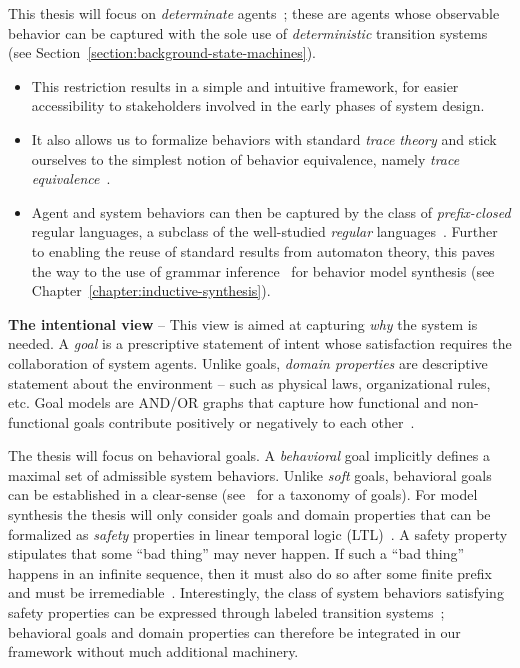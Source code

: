 This thesis will focus on \emph{determinate} agents~\cite{Engelfriet:1985}; these are agents whose observable behavior can be captured with the sole use of \emph{deterministic} transition systems (see Section~\ref{section:background-state-machines}).
\begin{itemize} 
\item This restriction results in a simple and intuitive framework, for easier accessibility to stakeholders involved in the early phases of system design. 
\item It also allows us to formalize behaviors with standard \emph{trace theory} \cite{Hoare:1985} and stick ourselves to the simplest notion of behavior equivalence, namely \emph{trace equivalence}~\cite{Engelfriet:1985}. 
\item Agent and system behaviors can then be captured by the class of \emph{prefix-closed} regular languages, a subclass of the well-studied \emph{regular} languages~\cite{Hopcroft:1979, Aho:1986}. Further to enabling the reuse of standard results from automaton theory, this paves the way to the use of grammar inference~\cite{Gold:1978} for behavior model synthesis (see Chapter~\ref{chapter:inductive-synthesis}). 
\end{itemize}


\noindent \textbf{The intentional view} -- This view is aimed at capturing \emph{why} the system is needed. A \emph{goal} is a prescriptive statement of intent whose satisfaction requires the collaboration of system agents. Unlike goals, \emph{domain properties} are descriptive statement about the environment -- such as physical laws, organizational rules, etc. Goal models are AND/OR graphs that capture how functional and non-functional goals contribute positively or negatively to each other~\cite{VanLamsweerde:2000, VanLamsweerde:2004}.

The thesis will focus on behavioral goals. A \emph{behavioral} goal implicitly defines a maximal set of admissible system behaviors. Unlike \emph{soft} goals, behavioral goals can be established in a clear-sense (see~\cite{VanLamsweerde:2009} for a taxonomy of goals). For model synthesis the thesis will only consider goals and domain properties that can be formalized as \emph{safety} properties in linear temporal logic (LTL)~\cite{Manna:1992}. A safety property stipulates that some ``bad thing'' may never happen. If such a ``bad thing'' happens in an infinite sequence, then it must also do so after some finite prefix and must be irremediable~\cite{Alpern:1986, Giannakopoulou:1999}. Interestingly, the class of system behaviors satisfying safety properties can be expressed through labeled transition systems~\cite{Giannakopoulou:2003}; behavioral goals and domain properties can therefore be integrated in our framework without much additional machinery.

